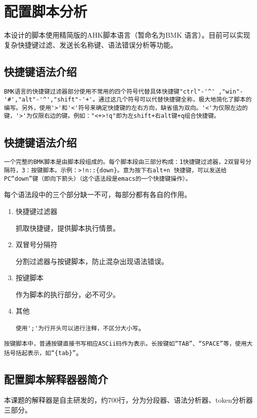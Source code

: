 \section{配置脚本分析}
本设计的脚本使用精简版的AHK脚本语言（暂命名为BMK 语言）。目前可以实现复杂快捷键过滤、发送长名称键、语法错误分析等功能。
\subsection{快捷键语法介绍}
\verb|BMK语言的快捷键过滤器部分使用不常用的四个符号代替具体快捷键"ctrl"-'^' ,"win"-'#',"alt"-'^',"shift"-'+'。通过这几个符号可以代替快捷键全称，极大地简化了脚本的编写。另外，使用'>'和'<'符号来确定快捷键的左右方向，缺省值为双向。'<'为仅限左边的键，'>'为仅限右边的键。例如："<+>!q"即为左shift+右alt键+q组合快捷键。|

\subsection{快捷键语法介绍}
\verb|一个完整的BMK脚本是由脚本段组成的。每个脚本段由三部分构成：1快捷键过滤器，2双冒号分隔符，3：按键脚本。示例：>!n::{down}。意为按下右alt+n 快捷键，可以发送给PC“down”键（即向下箭头）（这个语法段是emacs的一个快捷键操作）。|

每个语法段中的三个部分缺一不可，每部分都有各自的作用。
\begin{enumerate}
\item 快捷键过滤器

抓取快捷键，提供脚本执行情景。

\item 双冒号分隔符

分割过滤器与按键脚本，防止混杂出现语法错误。

\item 按键脚本

作为脚本的执行部分，必不可少。

\item 其他

\verb|使用';'为行开头可以进行注释，不区分大小写|。
\end{enumerate}

\verb|按键脚本中，普通按键直接书写相应ASCii码作为表示。长按键如“TAB”、“SPACE”等，使用大括号括起表示，如“{tab}”|。

\subsection{配置脚本解释器器简介}

本课题的解释器是自主研发的，约700行，分为分段器、语法分析器、token分析器三部分。



